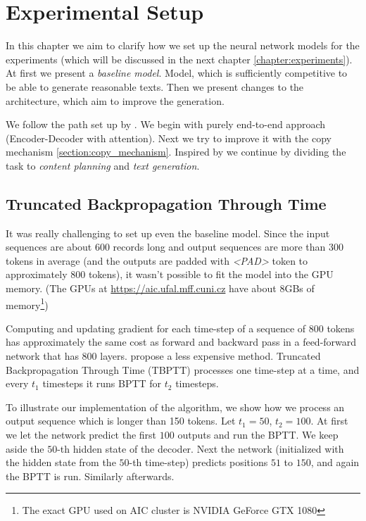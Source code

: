\chapter{Experimental Setup} \label{chapter:experimental_setup}
In this chapter we aim to clarify how we set up the neural network models for the experiments (which will be discussed in the next chapter \ref{chapter:experiments}). At first we present a \emph{baseline model}. Model, which is sufficiently competitive to be able to generate reasonable texts. Then we present changes to the architecture, which aim to improve the generation.

We follow the path set up by \citet{wiseman2017}. We begin with purely end-to-end approach (Encoder-Decoder with attention). Next we try to improve it with the copy mechanism \ref{section:copy_mechanism}. Inspired by \citet{puduppully2019datatotext} we continue by dividing the task to \emph{content planning} and \emph{text generation}.

\section{Truncated Backpropagation Through Time} \label{section:truncated_backpropagation}

It was really challenging to set up even the baseline model. Since the input sequences are about 600 records long and output sequences are more than 300 tokens in average (and the outputs are padded with \emph{\textless PAD\textgreater} token to approximately 800 tokens), it wasn't possible to fit the model into the GPU memory. (The GPUs at \url{https://aic.ufal.mff.cuni.cz} have about 8GBs of memory\footnote{The exact GPU used on AIC cluster is NVIDIA GeForce GTX 1080})

Computing and updating gradient for each time-step of a sequence of 800 tokens has approximately the same cost as forward and backward pass in a feed-forward network that has 800 layers. \citet{williamsTBPTT} propose a less expensive method. Truncated Backpropagation Through Time (TBPTT) processes one time-step at a time, and every $t_1$ timesteps it runs BPTT for $t_2$ timesteps.

To illustrate our implementation of the algorithm, we show how we process an output sequence which is longer than 150 tokens. Let $t_1 = 50$, $t_2 = 100$. At first we let the network predict the first $100$ outputs and run the BPTT. We keep aside the $50$-th hidden state of the decoder. Next the network (initialized with the hidden state from the $50$-th time-step) predicts positions $51$ to $150$, and again the BPTT is run. Similarly afterwards.

